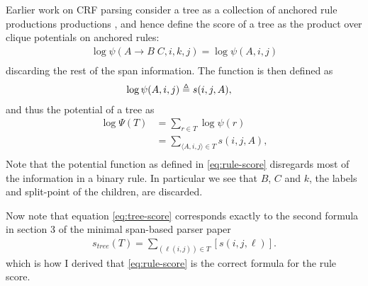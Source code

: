 Earlier work on CRF parsing consider a tree as a collection of anchored rule productions productions \cite{finkel2008crf,klein2015crf}, and hence define the score of a tree as the product over clique potentials on anchored rules:
\begin{align}
  \log\psi(A \to B \;C, i, k, j) = \log\psi(A, i, j)\\
\end{align}
discarding the rest of the span information. The function is then defined as
\begin{align}
  \label{eq:span-score}
  \log\psi(A, i, j) &\triangleq s(i, j, A),
\end{align}
and thus the potential of a tree as
\begin{align}
\label{eq:tree-score}
    \log\Psi(T) &= \sum_{r \in T} \log\psi(r) \\
      &= \sum_{\langle A, i, j \rangle \in T} s(i, j, A), \\
\end{align}
Note that the potential function as defined in \ref{eq:rule-score} disregards most of the information in a binary rule. In particular we see that $B$, $C$ and $k$, the labels and split-point of the children, are discarded.

Now note that equation \ref{eq:tree-score} corresponds exactly to the second formula in section 3 of the minimal span-based parser paper
\begin{align}
s_{tree}(T) = \sum_{(\ell(i,j))\in T}[s(i, j, \ell)] .
\end{align}
which is how I derived that \ref{eq:rule-score} is the correct formula for the rule score.


